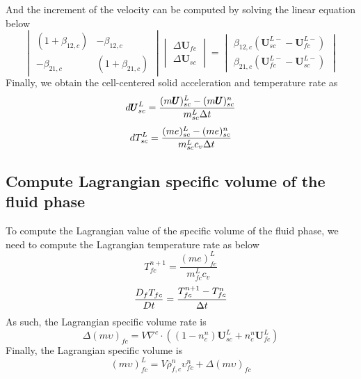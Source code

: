 \documentclass[preprint,12pt]{elsarticle}
\begin{document}
%
%
And the increment of the velocity can be computed by solving the linear equation below
%
\[ \begin{vmatrix} (1 + \beta_{12,c})  &  -\beta_{12,c} \\
                  -\beta_{21,c}       &  (1 + \beta_{21,c})
    \end{vmatrix}
    \begin{vmatrix} \Delta \pmb{U}_{fc} \\
                    \Delta \pmb{U}_{sc}
    \end{vmatrix}
    =
    \begin{vmatrix}  \beta_{12,c}(\pmb{U}_{sc}^{L-} - \pmb{U}_{fc}^{L-}) \\
                    \beta_{21,c}(\pmb{U}_{fc}^{L-} - \pmb{U}_{sc}^{L-})
    \end{vmatrix}                
\]
%
Finally, we obtain the cell-centered solid  acceleration and temperature rate as
%
%
\begin{equation}
 d\pmb{U}_{sc}^L = \frac{(m \pmb{U})_{sc}^L - (m \pmb{U})_{sc}^n}{m_{sc}^L \Delta{t}}
\end{equation}
%
\begin{equation}
 dT_{sc}^L = \frac{(me)_{sc}^L - (me)_{sc}^n}{m_{sc}^L c_v \Delta{t}}
\end{equation}
%
%
\subsection{\textsf{Compute Lagrangian specific volume of the fluid phase}}
To compute the Lagrangian value of the specific volume of the fluid phase, we need to compute the Lagrangian temperature rate as below
%
%
\begin{equation}
 T_{fc}^{n+1} = \frac{(me)_{fc}^L}{m_{fc}^L c_v}
\end{equation}
%
%
\begin{equation}
 \frac{D_f T_{fc}}{Dt} =  \frac{T_{fc}^{n+1} - T_{fc}^{n}}{\Delta{t}}
\end{equation}
%
%
As such, the Lagrangian specific volume rate is
%
%
\begin{equation}
 \Delta (m \upsilon)_{fc} = V \nabla^c \cdot ((1-n_c^n) \pmb{U}_{sc}^L + n_c^n \pmb{U}_{fc}^L)
\end{equation}
%
%
Finally, the Lagrangian specific volume is
\begin{equation}
 (m \upsilon)_{fc}^L = V \overline{\rho}_{f,c}^n \upsilon_{fc}^n + \Delta (m\upsilon)_{fc} 
\end{equation}
%
%
\end{document}
